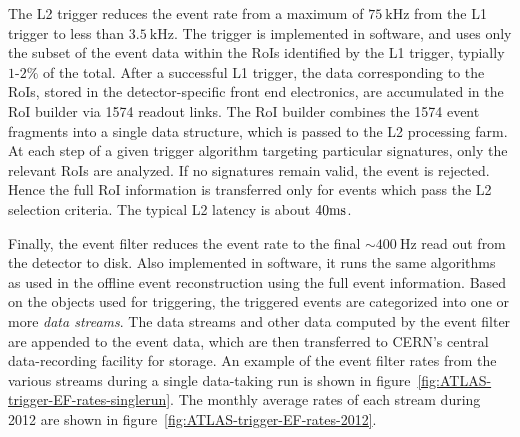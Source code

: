 The L2 trigger reduces the event rate from a maximum of $75~\mbox{kHz}$ from the L1 trigger to less than $3.5~\mbox{kHz}$. The trigger is implemented in software, and uses only the subset of the event data within the RoIs identified by the L1 trigger, typially $1$-$2\%$ of the total. After a successful L1 trigger, the data corresponding to the RoIs, stored in the detector-specific front end electronics, are accumulated in the RoI builder via 1574 readout links. The RoI builder combines the 1574 event fragments into a single data structure, which is passed to the L2 processing farm. At each step of a given trigger algorithm targeting particular signatures, only the relevant RoIs are analyzed. If no signatures remain valid, the event is rejected. Hence the full RoI information is transferred only for events which pass the L2 selection criteria. The typical L2 latency is about $40 \mathrm{ms}$.

Finally, the event filter reduces the event rate to the final $\sim400~\mbox{Hz}$ read out from the detector to disk. Also implemented in software, it runs the same algorithms as used in the offline event reconstruction using the full event information. Based on the objects used for triggering, the triggered events are categorized into one or more \emph{data streams}. The data streams and other data computed by the event filter are appended to the event data, which are then transferred to CERN’s central data-recording facility for storage. An example of the event filter rates from the various streams during a single data-taking run is shown in figure~\ref{fig:ATLAS-trigger-EF-rates-singlerun}. The monthly average rates of each stream during 2012 are shown in figure~\ref{fig:ATLAS-trigger-EF-rates-2012}.

